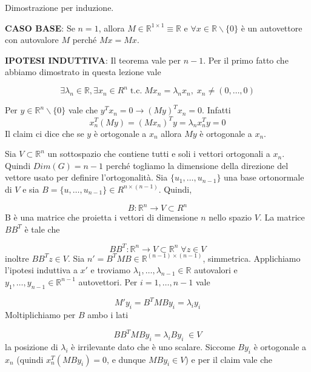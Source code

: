 \documentclass[12pt]{report}
\begin{document}
\begin{dimo}
    Dimostrazione per induzione.

    \noindent 
    \textbf{CASO BASE}: Se $n=1$, allora $M \in \mathbb{R}^{1 \times 1} \equiv \mathbb{R}$ e $\forall x \in \mathbb{R} \backslash \{0\}$ è un autovettore con autovalore $M$ perché $Mx = Mx$. %

    \vspace{5px}
    \noindent
     \textbf{IPOTESI INDUTTIVA}: Il teorema vale per $n-1$. Per il primo fatto che abbiamo dimostrato in questa lezione vale 

    $$
            \exists \lambda_n \in \mathbb{R}, \exists x_n \in R^{n}\; \text{t.c.}\;  Mx_n = \lambda_n x_n, \; x_n \neq (0,\dots,0)$$

    \begin{claim}
        Per $y \in \mathbb{R}^n \backslash \{0\}$ vale che $y^T x_n = 0 \rightarrow (My)^Tx_n = 0$. Infatti 
        $$x_n^T(My) = (Mx_n)^T y = \lambda_n x_n^T y = 0$$
        Il claim ci dice che se $y$ è ortogonale a $x_n$ allora $My$ è ortogonale a $x_n$.
    \end{claim}

    \noindent 
    Sia $V \subset \mathbb{R}^n$ un sottospazio che contiene tutti e soli i vettori ortogonali a $x_n$. Quindi $Dim(G) = n-1$ perché togliamo la dimensione della direzione del vettore usato per definire l'ortogonalità. Sia $\{u_1,\dots,u_{n-1}\}$ una base ortonormale di $V$ e sia $B = \{u,\dots,u_{n-1}\} \in R^{n \times (n-1)}$. Quindi,

    $$B: \mathbb{R}^{n} \rightarrow V \subset R^n$$ 
    B è una matrice che proietta i vettori di dimensione $n$ nello spazio $V$. La matrice $BB^T$ è tale che 

    $$BB^T: \mathbb{R}^n \rightarrow V \subset \mathbb{R}^n \; \forall z \in V$$
    inoltre $BB^Tz \in V$. Sia $n' = B^TMB \in \mathbb{R}^{(n-1) \times (n-1)}$, simmetrica. Applichiamo l'ipotesi induttiva a $x'$ e troviamo $\lambda_1,\dots,\lambda_{n-1} \in \mathbb{R}$ autovalori e $y_1,\dots,y_{n-1}  \in \mathbb{R}^{n-1}$ autovettori. Per $i = 1,\dots,n-1$  vale

    $$M'y_i = B^TMB y_i= \lambda_i y_i $$
    Moltiplichiamo per $B$ ambo i lati

    $$B B^TMB y_i =  \lambda_i B y_i  \; \in V$$
    la posizione di $\lambda_i$ è irrilevante dato che è uno scalare. Siccome $By_i$ è ortogonale a $x_n$ (quindi $x_n^T (MBy_i) = 0$, e dunque $MBy_i \in V$) e per il claim vale che 


\end{dimo}
\end{document}

